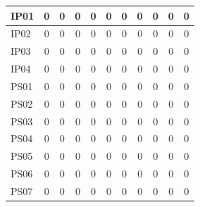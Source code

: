 \documentclass [10pt]{article}
\begin{document}
\begin{longtable}{ | p{}  | c | c | c | c | c | c | c | c | c | c | }
	IP01 & 0 & 0 & 0 & 0 & 0 & 0 & 0 & 0 & 0 & 0 \\ \hline
	IP02 & 0 & 0 & 0 & 0 & 0 & 0 & 0 & 0 & 0 & 0 \\ \hline
	IP03 & 0 & 0 & 0 & 0 & 0 & 0 & 0 & 0 & 0 & 0 \\ \hline
	IP04 & 0 & 0 & 0 & 0 & 0 & 0 & 0 & 0 & 0 & 0 \\ \hline
	PS01 & 0 & 0 & 0 & 0 & 0 & 0 & 0 & 0 & 0 & 0 \\ \hline
	PS02 & 0 & 0 & 0 & 0 & 0 & 0 & 0 & 0 & 0 & 0 \\ \hline
	PS03 & 0 & 0 & 0 & 0 & 0 & 0 & 0 & 0 & 0 & 0 \\ \hline
	PS04 & 0 & 0 & 0 & 0 & 0 & 0 & 0 & 0 & 0 & 0 \\ \hline
	PS05 & 0 & 0 & 0 & 0 & 0 & 0 & 0 & 0 & 0 & 0 \\ \hline
	PS06 & 0 & 0 & 0 & 0 & 0 & 0 & 0 & 0 & 0 & 0 \\ \hline
	PS07 & 0 & 0 & 0 & 0 & 0 & 0 & 0 & 0 & 0 & 0 \\ \hline
\end{longtable}
\end{document}
